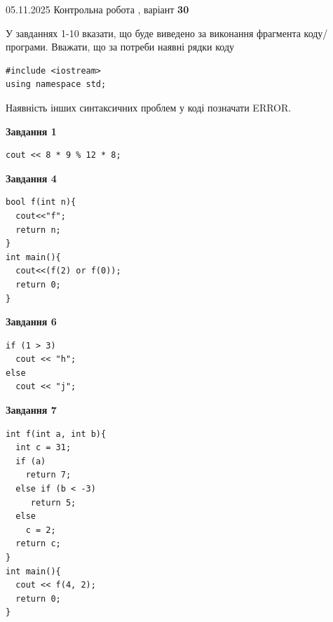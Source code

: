 \documentclass[12pt, ukrainian]{article}
\begin{document}
{\Large{05.11.2025 Контрольна робота , варіант  \No \textbf { 30 }\par}}
{
\begin {large}
У завданнях 1-10 вказати, що буде виведено за виконання фрагмента коду/про\-гра\-ми.
Вважати, що за потреби наявні рядки коду
\begin{verbatim}
#include <iostream>
using namespace std;
\end{verbatim}
Наявність інших синтаксичних проблем у коді позначати ERROR.

\begin{minipage}[t]{7.0cm}

\begin{center}
\textbf{Завдання 1}
\end{center}
\vspace{-8mm}

\begin{verbatim}
cout << 8 * 9 % 12 * 8;
\end{verbatim}



\begin{center}
\textbf{Завдання 4}
\end{center}
\vspace{-8mm}

\begin{verbatim}
bool f(int n){
  cout<<"f";
  return n;
}
int main(){
  cout<<(f(2) or f(0));
  return 0;
}
\end{verbatim}



\begin{center}
\textbf{Завдання 6}
\end{center}
\vspace{-8mm}

\begin{verbatim}
if (1 > 3)
  cout << "h";
else
  cout << "j";
\end{verbatim}



\begin{center}
\textbf{Завдання 7}
\end{center}
\vspace{-8mm}

\begin{verbatim}
int f(int a, int b){
  int c = 31;
  if (a)
    return 7;
  else if (b < -3)
     return 5;
  else
    c = 2;
  return c;
}
int main(){
  cout << f(4, 2);
  return 0;
}
\end{verbatim}


\end{minipage}
\end{large}}
\end{document}
